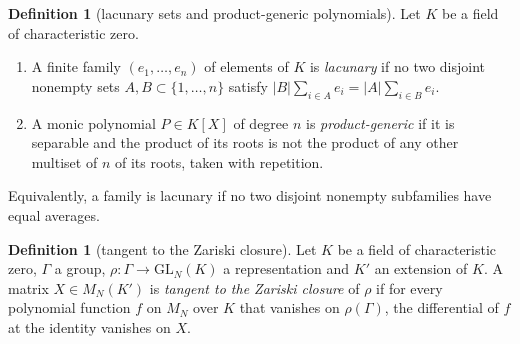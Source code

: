 \documentclass[11pt]{amsbook}
\theoremstyle{plain}
\theoremstyle{definition}
\newtheorem{definition}[theorem]{Definition}
\theoremstyle{remark}
\numberwithin{equation}{section}
\numberwithin{figure}{chapter}
\numberwithin{table}{chapter}
\begin{document}
\begin{definition}[lacunary sets and product-generic polynomials]
\label{def:lacunary}
Let $K$ be a field of characteristic zero.
\begin{enumerate}[label=(\arabic*)]
\item A finite family $(e_1,\dots,e_n)$ of elements of $K$ is
\emph{lacunary} if no two disjoint nonempty sets $A,B\subset
\{1,\dots,n\}$ satisfy $|B|\sum_{i\in A}e_i=|A|\sum_{i\in B}e_i$.
\item A monic polynomial $P\in K[X]$ of degree $n$ is
\emph{product-generic} if it is separable and the product of its roots
is not the product of any other multiset of $n$ of its roots, taken
with repetition.
\end{enumerate}
\end{definition}

\noindent Equivalently, a family is lacunary if no two disjoint
nonempty subfamilies have equal averages.
\begin{figure}[tbp]
\centering

\end{figure}

\begin{definition}[tangent to the Zariski closure]
\label{def:zariski-tangent}
Let $K$ be a field of characteristic zero, $\Gamma$ a group,
$\rho\colon\Gamma\to\mathrm{GL}_N(K)$ a representation and $K'$ an
extension of $K$. A matrix $X\in M_N(K')$ is \emph{tangent to the
Zariski closure} of $\rho$ if for every polynomial function $f$ on
$M_N$ over $K$ that vanishes on $\rho(\Gamma)$, the differential of
$f$ at the identity vanishes on $X$.
\end{definition}
\end{document}
